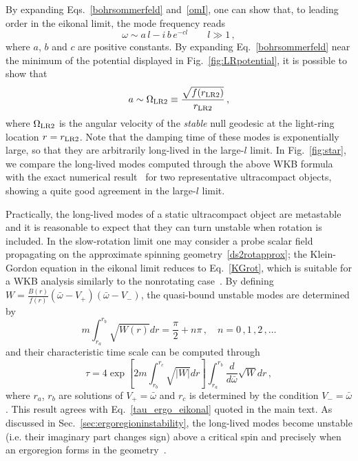 \documentclass[11pt]{article}
\numberwithin{equation}{section} %
\begin{document}
%
By expanding Eqs.~\eqref{bohrsommerfeld} and~\eqref{omI}, one can show that, to leading order in the eikonal limit, the mode frequency reads
%
\begin{equation}
\omega\sim a\, l -i\, b\, e^{-c l}\qquad l\gg1\,, \label{omega}
\end{equation}
%
where $a$, $b$ and $c$ are positive constants. By expanding Eq.~\eqref{bohrsommerfeld} near the minimum of the potential displayed in Fig.~\ref{fig:LRpotential}, it is possible to show that~\cite{Cardoso:2014sna}
%
\begin{equation}
 a\sim\Omega_{\rm LR2}\equiv\frac{\sqrt{f(r_{\rm LR2})}}{r_{\rm LR2}}\,,
\end{equation}
%
where $\Omega_{\rm LR2}$ is the angular velocity of the \emph{stable} null geodesic at the light-ring location $r=r_{\rm LR2}$. Note that the damping time of these modes is exponentially large, so that they are arbitrarily long-lived in the large-$l$ limit. In Fig.~\ref{fig:star}, we compare the long-lived modes computed through the above WKB formula with the exact numerical result~\cite{Cardoso:2014sna} for two representative ultracompact objects, showing a quite good agreement in the large-$l$ limit.

Practically, the long-lived modes of a static ultracompact object are metastable and it is reasonable to expect that they can turn unstable when rotation is included. In the slow-rotation limit one may consider a probe scalar field propagating on the approximate spinning geometry~\eqref{ds2rotapprox}; the Klein-Gordon equation in the eikonal limit reduces to Eq.~\eqref{KGrot}, which is suitable for a WKB analysis similarly to the nonrotating case~\cite{CominsSchutz,Cardoso:2007az}. By defining $W=\frac{B(r)}{f(r)}\left (\bar{\omega}-V_+\right )\left (\bar{\omega}-V_-\right )$, the quasi-bound unstable modes are determined by
%
\begin{equation}
m\int_{r_a}^{r_b}\sqrt{W(r)}dr =\frac{\pi}{2}+n\pi\,,\quad n=0\,,1\,,2\,,\dots
\end{equation}
%
and their characteristic time scale can be computed through
%
\begin{equation}
\tau=4\exp{\left[2m\int_{r_b}^{r_c}\sqrt{|W|}dr\right]}\int_{r_a}^{r_b}\frac{d}{d\bar{\omega}}
\sqrt{W}dr\,,
\end{equation}
%
where $r_a$, $r_b$ are solutions of $V_+=\bar{\omega}$ and $r_c$ is determined by the condition
$V_-=\bar{\omega}$. This result agrees with Eq.~\eqref{tau_ergo_eikonal} quoted in the main text.
As discussed in Sec.~\ref{sec:ergoregioninstability}, the long-lived modes become unstable (i.e. their imaginary part changes sign) above a critical spin and precisely when an ergoregion forms in the geometry~\cite{CominsSchutz,Cardoso:2007az,Cardoso:2014sna}.




%  


\end{document}
